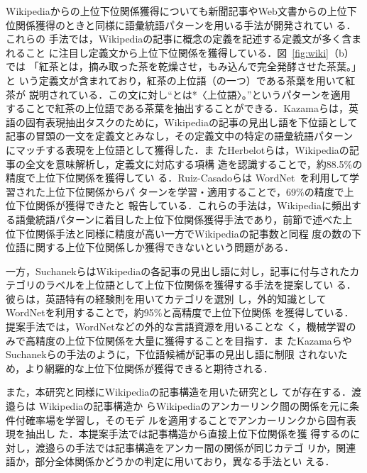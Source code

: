 \documentclass[japanese]{jnlp_1.4}
\begin{document}
Wikipediaからの上位下位関係獲得についても新聞記事やWeb文書からの上位下
位関係獲得のときと同様に語彙統語パターンを用いる手法が開発されてい
る\cite{Ruiz-Casado_2005,Herbelot_2006,Toral_06,Kazama_2007}．これらの
手法では，Wikipediaの記事に概念の定義を記述する定義文が多く含まれること
に注目し定義文から上位下位関係を獲得している．図~\ref{fig:wiki}（b）では
「紅茶とは，摘み取った茶を乾燥させ，もみ込んで完全発酵させた茶葉。」と
いう定義文が含まれており，紅茶の上位語（の一つ）である茶葉を用いて紅茶が
説明されている．この文に対し“とは*〈上位語〉。”というパターンを適用
することで紅茶の上位語である茶葉を抽出することができる．Kazamaらは，英
語の固有表現抽出タスクのために，Wikipediaの記事の見出し語を下位語として
記事の冒頭の一文を定義文とみなし，その定義文中の特定の語彙統語パターン
にマッチする表現を上位語として獲得した\cite{Kazama_2007}．ま
たHerbelotらは，Wikipediaの記事の全文を意味解析し，定義文に対応する項構
造を認識することで，約88.5\%の精度で上位下位関係を獲得してい
る\cite{Herbelot_2006}．Ruiz-Casadoらは
WordNet~\cite{wordnet-book_1998}を利用して学習された上位下位関係からパ
ターンを学習・適用することで，69\%の精度で上位下位関係が獲得できたと
報告している\cite{Ruiz-Casado_2005}．これらの手法は，Wikipediaに頻出す
る語彙統語パターンに着目した上位下位関係獲得手法であり，前節で述べた上
位下位関係手法と同様に精度が高い一方で{Wikipediaの記事数と同程
度の数の下位語に関する上位下位関係しか}獲得できないという問題がある．

一方，SuchanekらはWikipediaの各記事の見出し語に対し，記事に付与されたカ
テゴリのラベルを上位語として上位下位関係を獲得する手法を提案してい
る\cite{Suchanek_2007}．彼らは，英語特有の経験則を用いてカテゴリを選別
し，外的知識としてWordNetを利用することで，約95\%と高精度で上位下位関係
を獲得している．提案手法では，WordNetなどの外的な言語資源を用いることな
く，機械学習のみで高精度の上位下位関係を大量に獲得することを目指す．ま
たKazamaらやSuchanekらの手法のように，下位語候補が記事の見出し語に制限
されないため，より網羅的な上位下位関係が獲得できると期待される．

また，本研究と同様にWikipediaの記事構造を用いた研究とし
て\cite{Watanabe_2008}が存在する．渡邉らは Wikipediaの記事構造か
らWikipediaのアンカーリンク間の関係を元に条件付確率場を学習し，そのモデ
ルを適用することでアンカーリンクから固有表現を抽出し
た\cite{Watanabe_2008}．本提案手法では記事構造から直接上位下位関係を獲
得するのに対し，渡邉らの手法では記事構造をアンカー間の関係が同じカテゴ
リか，関連語か，部分全体関係かどうかの判定に用いており，異なる手法とい
える．
\end{document}
